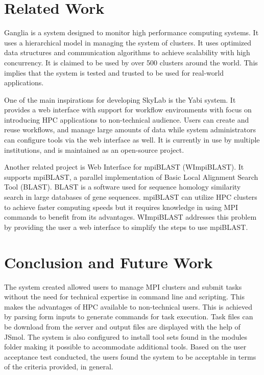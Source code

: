 \section{Related Work}
Ganglia is a system designed to monitor high performance computing systems. It uses a hierarchical model in managing the system of clusters. It uses optimized data structures and communication algorithms to achieve scalability with high concurrency. It is claimed to be used by over 500 clusters around the world. This implies that the system is tested and trusted to be used for real-world applications\cite{1395654820040701}.
	    
One of the main inspirations for developing SkyLab is the Yabi system. It provides a web interface with support for workflow environments with focus on introducing HPC applications to non-technical audience. Users can create and reuse workflows, and manage large amounts of data while system administrators can configure tools via the web interface as well. It is currently in use by multiple institutions, and is maintained as an open-source project\cite{7411021620120101}.	    	    
	    
Another related project is Web Interface for mpiBLAST (WImpiBLAST). It supports mpiBLAST, a parallel implementation of Basic Local Alignment Search Tool (BLAST). BLAST is a software used for sequence homology similarity search in large databases of gene sequences. mpiBLAST can utilize HPC clusters to achieve faster computing speeds but it requires knowledge in using MPI commands to benefit from its advantages. WImpiBLAST addresses this problem by providing the user a web interface to simplify the steps to use mpiBLAST\cite{9686120720140601}.   
	
\section{Conclusion and Future Work}
The system created allowed users to manage MPI clusters and submit tasks without the need for technical expertise in command line and scripting. This makes the advantages of HPC available to non-technical users. This is achieved by parsing form inputs to generate commands for task execution. Task files can be download from the server and output files are displayed with the help of JSmol\cite{IJCH:IJCH201300024}. The system is also configured to install tool sets found in the modules folder making it possible to accommodate additional tools. Based on the user acceptance test conducted, the users found the system to be acceptable in terms of the criteria provided, in general. 

